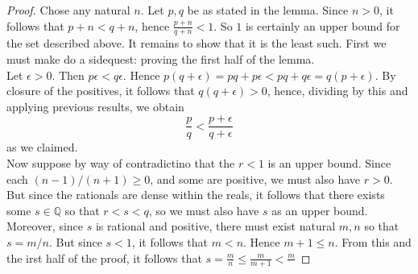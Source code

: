 \documentclass[11pt]{article}
\newcommand{\Q}{\mathbb{Q}}
\theoremstyle{definition}
\begin{document}
\begin{proof}
Chose any natural $n$. Let $p,q$ be as stated in the lemma. Since $n> 0$, it follows that $p + n < q + n$, hence $\frac{p + n}{q+n} < 1$. So $1$ is certainly an upper bound for the set described above. It remains to show that it is the least such. First we must make do a sidequest: proving the first half of the lemma. \\

Let $\epsilon > 0$. Then $p\epsilon < q\epsilon.$ Hence $p(q + \epsilon)= pq + p\epsilon < pq + q\epsilon = q(p+ \epsilon)$. By closure of the positives, it follows that $q(q + \epsilon) > 0$, hence, dividing by this and applying previous results, we obtain
$$ \frac{p}{q} < \frac{p +\epsilon}{q + \epsilon} $$ as we claimed. \\

Now suppose by way of contradictino that the $r< 1$ is an upper bound. Since each $(n-1)/(n+1) \ge 0$, and some are positive, we must also have $r> 0$. But since the rationals are dense within the reals, it follows that there exists some $s\in \Q$ so that $r< s< q$, so we must also have $s$ as an upper bound. Moreover, since $s$ is rational and positive, there must exist natural $m, n$ so that $s = m/n$. But since $s< 1$, it follows that $m < n$. Hence $m + 1 \le n$. From this and the irst half of the proof, it follows that $s = \frac{m}{n} \le \frac{m}{m+ 1} < \frac{m }{}$

\end{proof}
\end{document}
